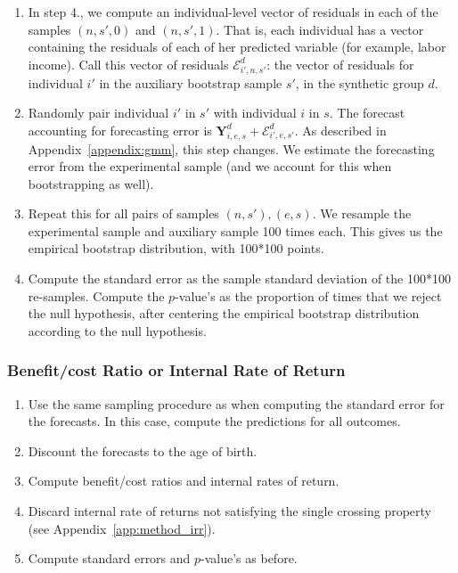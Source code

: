 \begin{enumerate}
\item In step 4., we compute an individual-level vector of residuals in each of the samples $(n,s',0)$ and $(n,s',1)$. That is, each individual has a vector containing the residuals of each of her predicted variable (for example, labor income). Call this vector of residuals $\bm{\mathcal{E}}_{i',n,s'}^d$: the vector of residuals for individual $i'$ in the auxiliary bootstrap sample $s'$, in the synthetic group $d$.

\item Randomly pair individual $i'$ in $s'$ with individual $i$ in $s$. The forecast accounting for forecasting error is $\bm{Y}_{i,e,s}^d + \bm{\mathcal{E}}_{i',e,s'}^d$. As described in Appendix~\ref{appendix:gmm}, this step changes. We estimate the forecasting error from the experimental sample (and we account for this when bootstrapping as well).

\item Repeat this for all pairs of samples $(n,s'), (e,s)$. We resample the experimental sample and auxiliary sample 100 times each. This gives us the empirical bootstrap distribution, with 100*100 points.

\item Compute the standard error as the sample standard deviation of the 100*100 re-samples. Compute the $p$-value's as the proportion of times that we reject the null hypothesis, after centering the empirical bootstrap distribution according to the null hypothesis.

\end{enumerate}

\subsubsection{Benefit/cost Ratio or Internal Rate of Return}

\begin{enumerate}

\item Use the same sampling procedure as when computing the standard error for the forecasts. In this case, compute the predictions for all outcomes.
\item Discount the forecasts to the age of birth.
\item Compute benefit/cost ratios and internal rates of return.
\item Discard internal rate of returns not satisfying the single crossing property (see Appendix~\ref{app:method_irr}).
\item Compute standard errors and $p$-value's as before.

\end{enumerate}


